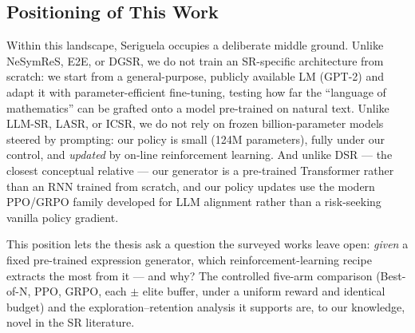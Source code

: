 \subsection{Positioning of This Work}
\label{sec:positioning}

Within this landscape, Seriguela occupies a deliberate middle ground. Unlike NeSymReS, E2E, or DGSR, we do not train an SR-specific architecture from scratch: we start from a general-purpose, publicly available LM (GPT-2) and adapt it with parameter-efficient fine-tuning, testing how far the ``language of mathematics'' can be grafted onto a model pre-trained on natural text. Unlike LLM-SR, LASR, or ICSR, we do not rely on frozen billion-parameter models steered by prompting: our policy is small (124M parameters), fully under our control, and \emph{updated} by on-line reinforcement learning. And unlike DSR --- the closest conceptual relative --- our generator is a pre-trained Transformer rather than an RNN trained from scratch, and our policy updates use the modern PPO/GRPO family developed for LLM alignment rather than a risk-seeking vanilla policy gradient.

This position lets the thesis ask a question the surveyed works leave open: \emph{given} a fixed pre-trained expression generator, which reinforcement-learning recipe extracts the most from it --- and why? The controlled five-arm comparison (Best-of-N, PPO, GRPO, each $\pm$ elite buffer, under a uniform reward and identical budget) and the exploration--retention analysis it supports are, to our knowledge, novel in the SR literature.

